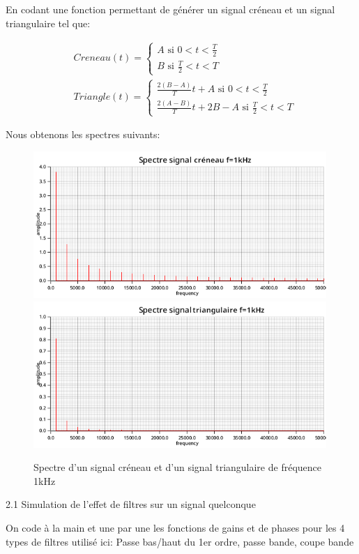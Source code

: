 \documentclass{article}
\newcommand{\expart}[1]
{
    \begin{largeUnderline}#1\end{largeUnderline}\par
}
\begin{document}
En codant une fonction permettant de générer un signal créneau et un signal triangulaire tel que:

\begin{align*}
  &Creneau(t) = \begin{cases}
    A \text{ si } 0<t<\frac{T}{2}\\
    B \text{ si } \frac{T}{2}<t<T
  \end{cases}\\
  &Triangle(t) = \begin{cases}
    \frac{2(B-A)}{T}t+A \text{ si } 0<t<\frac{T}{2}\\
    \frac{2(A-B)}{T}t+2B-A \text{ si } \frac{T}{2}<t<T
  \end{cases}
\end{align*}

Nous obtenons les spectres suivants:

\begin{figure}[H]
  \centering
  \includegraphics[height=15em]{images/creneau/fft_in.png}
  \includegraphics[height=15em]{images/triangulaire/fft_in.png}
  \caption{Spectre d'un signal créneau et d'un signal triangulaire de fréquence 1kHz}
\end{figure}

\expart{2.1 Simulation de l'effet de filtres sur un signal quelconque}

On code à la main et une par une les fonctions de gains et de phases pour les 4 types de filtres utilisé ici: Passe bas/haut du 1er ordre, passe bande, coupe bande 
\end{document}
